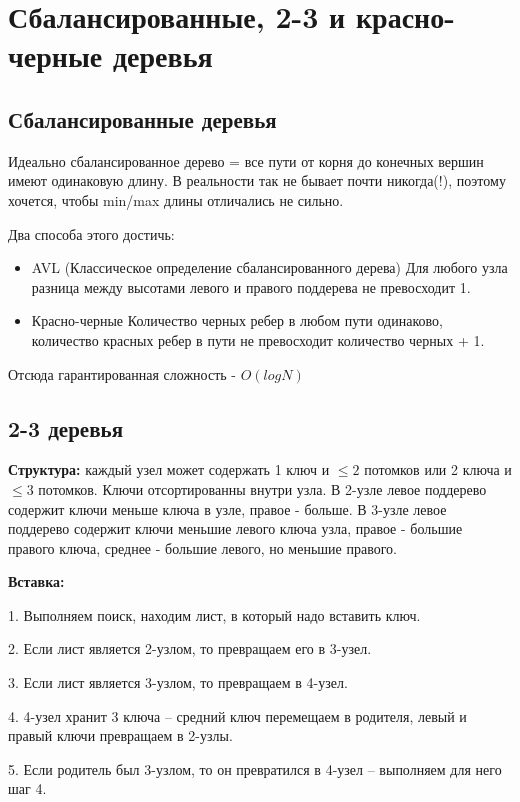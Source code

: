 \section{Сбалансированные, 2-3 и красно-черные деревья}

\subsection*{Сбалансированные деревья}
Идеально сбалансированное дерево = все пути от корня до
конечных вершин имеют одинаковую длину.
В реальности так не бывает почти никогда(!), поэтому хочется, чтобы min/max длины отличались не сильно.

Два способа этого достичь:

\begin{itemize}
\item AVL (Классическое определение сбалансированного дерева)
Для любого узла разница между высотами левого и правого
поддерева не превосходит 1.
\item Красно-черные Количество черных ребер в любом пути одинаково,
количество красных ребер в пути не превосходит количество
черных + 1.
\end{itemize}

Отсюда гарантированная сложность - $O(logN)$

\subsection*{2-3 деревья}

{\bf Структура:} каждый узел может содержать 1 ключ и $\le 2$ потомков или 2 ключа и $\le 3$ потомков. Ключи отсортированны внутри узла. В 2-узле левое поддерево содержит ключи меньше ключа в узле, правое - больше. В 3-узле левое поддерево содержит ключи меньшие левого ключа узла, правое - большие правого ключа, среднее - большие левого, но меньшие правого.

{\bf Вставка:} 

1. Выполняем поиск, находим лист, в который надо
вставить ключ.

2. Если лист является 2-узлом, то превращаем его в 3-узел.

3. Если лист является 3-узлом, то превращаем в 4-узел.

4. 4-узел хранит 3 ключа – средний ключ перемещаем в
родителя, левый и правый ключи превращаем в 2-узлы.

5. Если родитель был 3-узлом, то он превратился в 4-узел
– выполняем для него шаг 4.
 
